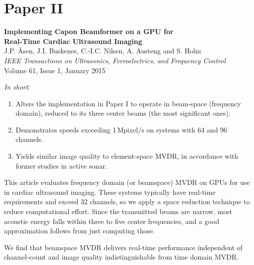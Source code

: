 \section{Paper II}\label{sec:paperII} %
\textbf{Implementing Capon Beamformer on a GPU for\\ Real-Time Cardiac Ultrasound Imaging}~\cite{Asen2013}\\
J.P. Åsen, J.I. Buskenes, C.-I.C. Nilsen, A. Austeng and S. Holm\\
\textit{IEEE Transactions on Ultrasonics, Ferroelectrics, and Frequency Control}\\
Volume 61, Issue 1, January 2015

\textit{In short}:
\begin{enumerate}
\item Alters the implementation in Paper I to operate in beam-space (frequency domain), reduced to its three center beams (the most significant ones).
\item Demonstrates speeds exceeding 1\,Mpixel/s on systems with 64 and 96 channels.
\item Yields similar image quality to element-space MVDR, in accordance with former studies in active sonar.
\end{enumerate}

This article evaluates frequency domain (or beamspace) MVDR on GPUs for use in cardiac ultrasound imaging. These systems typically have real-time requirements and exceed 32 channels, so we apply a space reduction technique to reduce computational effort. Since the transmitted beams are narrow, most acoustic energy falls within three to five center frequencies, and a good approximation follows from just computing those.

We find that beamspace MVDR delivers real-time performance independent of channel-count and image quality indistinguishable from time domain MVDR.


%
%


